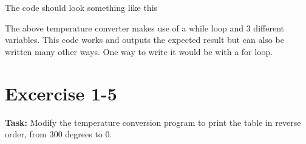\documentclass[12pt, letterpaper]{report}
\begin{document}
The code should look something like this



The above temperature converter makes use of a while loop and 3 different variables.
This code works and outputs the expected result but can also be written many other ways.
One way to write it would be with a for loop.



\section{Excercise 1-5}
\textbf{Task:} Modify the temperature conversion program to print the table in
reverse order, from 300 degrees to 0.


\end{document}
